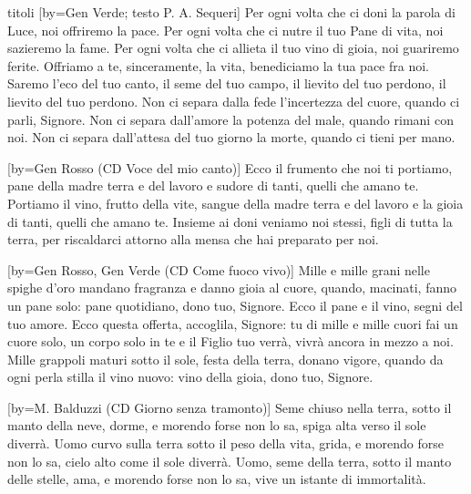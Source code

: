 \begin{songs}{titoli}
[by={Gen Verde; testo P. A. Sequeri}]
\beginverse
Per ogni volta che ci doni la parola di Luce, noi offriremo la pace.
Per ogni volta che ci nutre il tuo Pane di vita, noi sazieremo la fame.
Per ogni volta che ci allieta il tuo vino di gioia, noi guariremo ferite.
\endverse
\beginchorus
Offriamo a te, sinceramente, la vita, benediciamo la tua pace fra noi.
Saremo l'eco del tuo canto, il seme del tuo campo,
il lievito del tuo perdono, il lievito del tuo perdono.
\endchorus
\beginverse
Non ci separa dalla fede l'incertezza del cuore, quando ci parli, Signore.
Non ci separa dall'amore la potenza del male, quando rimani con noi.
Non ci separa dall'attesa del tuo giorno la morte, quando ci tieni per mano.
\endverse
\endsong

[by={Gen Rosso (CD Voce del mio canto)}]
\beginverse
Ecco il frumento che noi ti portiamo,
pane della madre terra
e del lavoro e sudore di tanti,
quelli che amano te.
\endverse
\beginverse
Portiamo il vino, frutto della vite,
sangue della madre terra
e del lavoro e la gioia di tanti,
quelli che amano te.
\endverse
\beginverse
Insieme ai doni veniamo noi stessi,
figli di tutta la terra,
per riscaldarci attorno alla mensa
che hai preparato per noi.
\endverse
\endsong

[by={Gen Rosso, Gen Verde (CD Come fuoco vivo)}]
\beginverse
Mille e mille grani nelle spighe d'oro
mandano fragranza e danno gioia al cuore,
quando, macinati, fanno un pane solo:
pane quotidiano, dono tuo, Signore.
\endverse
\beginchorus
Ecco il pane e il vino, segni del tuo amore.
Ecco questa offerta, accoglila, Signore:
tu di mille e mille cuori fai un cuore solo, un corpo solo in te
e il Figlio tuo verrà, vivrà ancora in mezzo a noi.
\endchorus
\beginverse
Mille grappoli maturi sotto il sole,
festa della terra, donano vigore,
quando da ogni perla stilla il vino nuovo:
vino della gioia, dono tuo, Signore.
\endverse
\endsong

[by={M. Balduzzi (CD Giorno senza tramonto)}]
\beginverse
Seme chiuso nella terra, sotto il manto della neve,
dorme, e morendo forse non lo sa, spiga alta verso il sole diverrà.
\endverse
\beginverse
Uomo curvo sulla terra sotto il peso della vita,
grida, e morendo forse non lo sa, cielo alto come il sole diverrà.
\endverse
\beginverse
Uomo, seme della terra, sotto il manto delle stelle,
ama, e morendo forse non lo sa, vive un istante di immortalità.
\endverse
\endsong


\end{songs}
